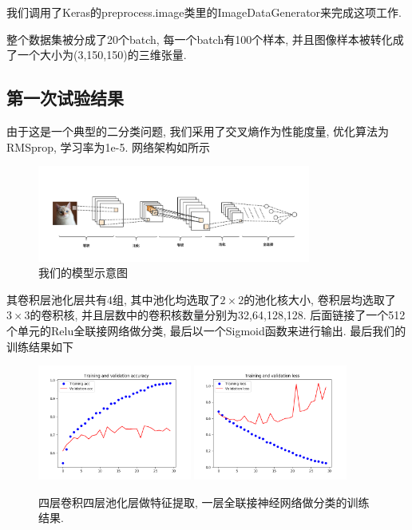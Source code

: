\documentclass[lang=cn,11pt]{elegantpaper}
\begin{document}
我们调用了Keras的preprocess.image类里的ImageDataGenerator来完成这项工作.

整个数据集被分成了20个batch, 每一个batch有100个样本, 并且图像样本被转化成了一个大小为(3,150,150)的三维张量.

\subsection{第一次试验结果}

由于这是一个典型的二分类问题, 我们采用了交叉熵作为性能度量, 优化算法为RMSprop, 学习率为1e-5. 网络架构如所示

\begin{figure}[hbt]
  \includegraphics[width=0.8\textwidth]{small_network.jpg}
  \caption{我们的模型示意图\label{fig:small_network}}
\end{figure}

其卷积层池化层共有4组, 其中池化均选取了$2\times 2$的池化核大小, 卷积层均选取了$3\times 3$的卷积核, 并且层数中的卷积核数量分别为32,64,128,128. 后面链接了一个512个单元的Relu全联接网络做分类, 最后以一个Sigmoid函数来进行输出. 最后我们的训练结果如下

\begin{figure}[hbt]
  \includegraphics[width=0.45\textwidth]{small_without_aug_1.png}
  \includegraphics[width=0.45\textwidth]{small_without_aug_2}
  \caption{四层卷积四层池化层做特征提取, 一层全联接神经网络做分类的训练结果.}
\end{figure}
\end{document}

